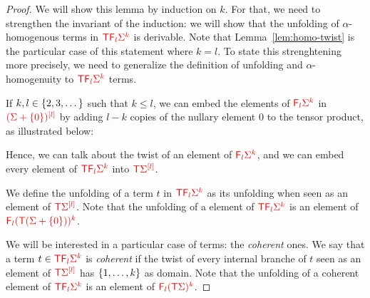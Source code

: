 \begin{proof}
We will show this lemma by induction on $k$. For that, we need to strengthen the invariant of the induction: we will show that the unfolding of $\alpha$-homogenous terms in $\ranked{\tmonad \reduce l\rSigma^k}$ is derivable. Note that Lemma~\ref{lem:homo-twist} is the particular case of this statement where $k=l$. To state this strenghtening more precisely, we need to generalize the definition of unfolding and $\alpha$-homogenuity to $\ranked{\tmonad \reduce l\rSigma^k}$ terms.



If $k, l\in \set{2,3,\dots}$ such that $k\leq l$, we can embed the elements of $\ranked{\reduce l \rSigma^k}$ in 
$\ranked{\mati l {(\rSigma+\set{0})}}$ by adding $l-k$ copies of the nullary element $0$ to the tensor product, as illustrated below:
\begin{center}

\end{center}  
Hence, we can talk about the twist of an element of $\ranked{\reduce l \Sigma^k}$, and we can embed every element of $\ranked{\tmonad \reduce l \Sigma^k}$  into $\ranked{\tmonad \mati l \Sigma}$.

We define the unfolding of a term $t$ in $\ranked{\tmonad \reduce l \Sigma^k}$ as its unfolding when seen as an element of $\ranked{\tmonad \mati l \Sigma}$. Note that the unfolding of a element of $\ranked{\tmonad \reduce l \Sigma^k}$ is an element of $\ranked{\reduce l(\tmonad (\Sigma+\set{0}))^k}$.

We will be interested in a particular case of terms: the \emph{coherent} ones. We say that a term $t\in \ranked{\tmonad \reduce l \Sigma^k}$ is \emph{coherent} if the twist of every internal branche of $t$ seen as an element of $\ranked{\tmonad \mati l \Sigma}$ has $\set{1,\ldots,k}$ as domain. Note that the unfolding of a coherent element of $\ranked{\tmonad \reduce l \Sigma^k}$ is an element of $\ranked{\reduce l(\tmonad \Sigma)^k}$.



\end{proof}
